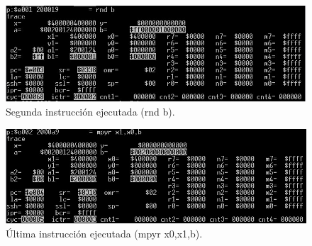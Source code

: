 \begin{figure}[H]
    \centering
    \includegraphics[scale=1]{figs/ej4/4.jpg}
    \caption{Segunda instrucción ejecutada (rnd b). }
    \label{fig:ej4_inst2}
\end{figure}

\begin{figure}[H]
    \centering
    \includegraphics[scale=1]{figs/ej4/5.jpg}
    \caption{Última instrucción ejecutada (mpyr x0,x1,b). }
    \label{fig:ej4_inst3}
\end{figure}